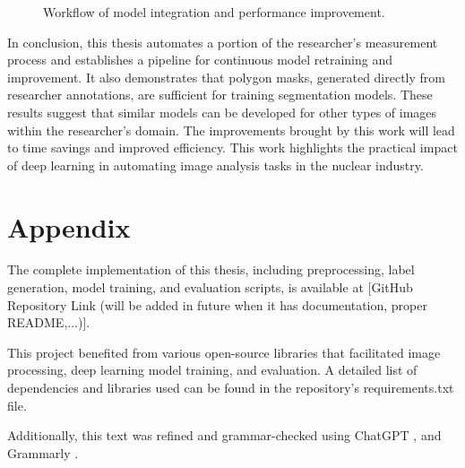 \begin{figure}[H]
    \centering
    \caption{Workflow of model integration and performance improvement.}
    \label{fig:workflow-diagram}
\end{figure}

In conclusion, this thesis automates a portion of the researcher’s measurement process and establishes a pipeline for continuous model retraining and improvement. It also demonstrates that polygon masks, generated directly from researcher annotations, are sufficient for training segmentation models. These results suggest that similar models can be developed for other types of images within the researcher’s domain. The improvements brought by this work will lead to time savings and improved efficiency. This work highlights the practical impact of deep learning in automating image analysis tasks in the nuclear industry.

\chapter{Appendix}

The complete implementation of this thesis, including preprocessing, label generation, model training, and evaluation scripts, is available at [GitHub Repository Link (will be added in future when it has documentation, proper README,...)].

This project benefited from various open-source libraries that facilitated image processing, deep learning model training, and evaluation. A detailed list of dependencies and libraries used can be found in the repository’s requirements.txt file.

Additionally, this text was refined and grammar-checked using ChatGPT \cite{chatgpt2025}, and Grammarly \cite{grammarly2025}.

